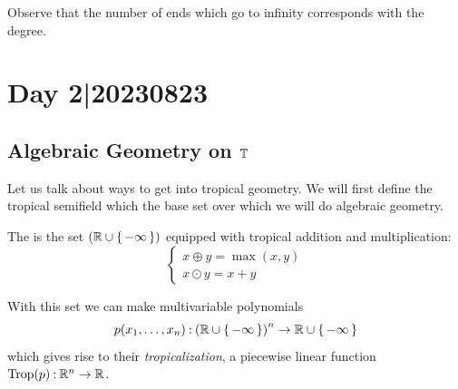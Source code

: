 \documentclass[12pt]{memoir}
\DeclareMathOperator{\Trop}{Trop}
\theoremstyle{definition}
\begin{document}
Observe that the number of ends which go to infinity corresponds with the degree. 



\section{Day 2|20230823}
\subsection{Algebraic Geometry on $\mathbb{T}$}
Let us talk about ways to get into tropical geometry. We will first define the tropical semifield which the base set over which we will do algebraic geometry.

\begin{Def}
    The  is the set $(\mathbb{R}\cup\{\,-\infty\,\})$ equipped with tropical addition and multiplication:
    $$
    \begin{cases}
        x\oplus y=\max(x,y)\\
        x\odot y=x+y
    \end{cases}
    $$
\end{Def}

With this set we can make multivariable polynomials 
$$p(x_1,\dots,x_n)\mathbin{:}\left(\mathbb{R}\cup\{\,-\infty\,\}\right)^n\to\mathbb{R}\cup\{\,-\infty\,\}$$
which gives rise to their \emph{tropicalization}, a piecewise linear function $\Trop(p)\:\bR^n\to\bR$.
\end{document}
